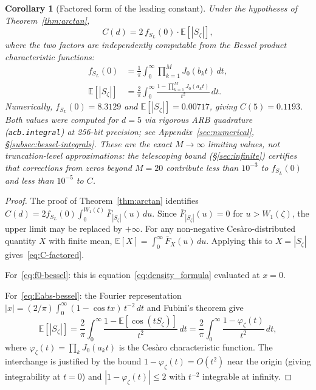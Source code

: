 \documentclass[12pt,reqno]{amsart}
\theoremstyle{plain}
\newtheorem{corollary}[theorem]{Corollary}
\theoremstyle{definition}
\theoremstyle{remark}
\newcommand{\E}{\mathbb{E}}
\begin{document}
\begin{corollary}[Factored form of the leading constant]\label{cor:C-factored}
Under the hypotheses of Theorem~\ref{thm:arctan},
\begin{equation}\label{eq:C-factored}
  C(d) = 2\,f_{S_L}(0)\cdot \E[|S_\zeta|],
\end{equation}
where the two factors are independently computable from the Bessel product characteristic functions:
\begin{align}
  f_{S_L}(0) &= \frac{1}{\pi}\int_0^\infty \prod_{k=1}^M J_0(b_k t)\, dt, \label{eq:f0-bessel}\\[4pt]
  \E[|S_\zeta|] &= \frac{2}{\pi}\int_0^\infty \frac{1 - \prod_{k=1}^M J_0(a_k t)}{t^2}\, dt. \label{eq:Eabs-bessel}
\end{align}
Numerically, $f_{S_L}(0) = 8.3129$ and $\E[|S_\zeta|] = 0.00717$, giving $C(5) = 0.1193$.  Both values were computed for $d = 5$ via rigorous ARB quadrature (\texttt{acb.integral}) at 256-bit precision; see Appendix~\ref{sec:numerical}, \S\ref{subsec:bessel-integrals}.  These are the exact $M \to \infty$ limiting values, not truncation-level approximations: the telescoping bound (\S\ref{sec:infinite}) certifies that corrections from zeros beyond $M = 20$ contribute less than $10^{-3}$ to $f_{S_L}(0)$ and less than $10^{-5}$ to $C$.
\end{corollary}

\begin{proof}
The proof of Theorem~\ref{thm:arctan} identifies $C(d) = 2f_{S_L}(0)\int_0^{W_1(\zeta)} \overline{F}_{|S_\zeta|}(u)\, du$.  Since $\overline{F}_{|S_\zeta|}(u) = 0$ for $u > W_1(\zeta)$, the upper limit may be replaced by $+\infty$.  For any non-negative Ces\`aro-distributed quantity $X$ with finite mean, $\E[X] = \int_0^\infty \overline{F}_X(u)\, du$.  Applying this to $X = |S_\zeta|$ gives~\eqref{eq:C-factored}.

For~\eqref{eq:f0-bessel}: this is equation~\eqref{eq:density_formula} evaluated at $x = 0$.

For~\eqref{eq:Eabs-bessel}: the Fourier representation $|x| = (2/\pi)\int_0^\infty (1 - \cos tx)\,t^{-2}\, dt$ and Fubini's theorem give
\[
  \E[|S_\zeta|] = \frac{2}{\pi}\int_0^\infty \frac{1 - \E[\cos(tS_\zeta)]}{t^2}\, dt = \frac{2}{\pi}\int_0^\infty \frac{1 - \varphi_\zeta(t)}{t^2}\, dt,
\]
where $\varphi_\zeta(t) = \prod_k J_0(a_k t)$ is the Ces\`aro characteristic function.  The interchange is justified by the bound $1 - \varphi_\zeta(t) = O(t^2)$ near the origin (giving integrability at $t = 0$) and $|1 - \varphi_\zeta(t)| \leq 2$ with $t^{-2}$ integrable at infinity.
\end{proof}
\end{document}

